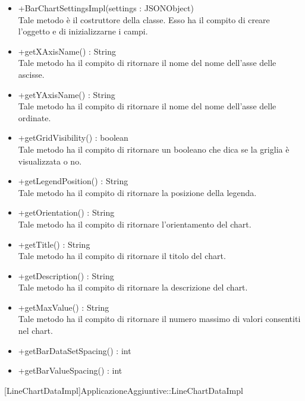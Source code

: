 \begin{itemize}
\begin{itemize}
					\item[\ding{111}] {{+BarChartSettingsImpl(settings : JSONObject)}} \\ [1mm] Tale metodo è il costruttore della classe. Esso ha il compito di creare l'oggetto e di inizializzarne i campi.
					\item[\ding{111}] {{+getXAxisName() : String}} \\ [1mm] Tale metodo ha il compito di ritornare il nome del nome dell'asse delle ascisse.
					\item[\ding{111}] {{+getYAxisName() : String}} \\ [1mm] Tale metodo ha il compito di ritornare il nome del nome dell'asse delle ordinate.
					\item[\ding{111}] {{+getGridVisibility() : boolean}} \\ [1mm] Tale metodo ha il compito di ritornare un booleano che dica se la griglia è visualizzata o no.
					\item[\ding{111}] {{+getLegendPosition() : String}} \\ [1mm] Tale metodo ha il compito di ritornare la posizione della legenda.
					\item[\ding{111}] {{+getOrientation() : String}} \\ [1mm] Tale metodo ha il compito di ritornare l'orientamento del chart.
					\item[\ding{111}] {{+getTitle() : String}} \\ [1mm] Tale metodo ha il compito di ritornare il titolo del chart.
					\item[\ding{111}] {{+getDescription() : String}} \\ [1mm] Tale metodo ha il compito di ritornare la descrizione del chart.
					\item[\ding{111}] {{+getMaxValue() : String}} \\ [1mm] Tale metodo ha il compito di ritornare il numero massimo di valori consentiti nel chart.
					\item[\ding{111}] {{+getBarDataSetSpacing() : int}}
					\item[\ding{111}] {{+getBarValueSpacing() : int}}
				\end{itemize}
		
			\end{itemize}
	
			[LineChartDataImpl]{ApplicazioneAggiuntive::LineChartDataImpl}
			

